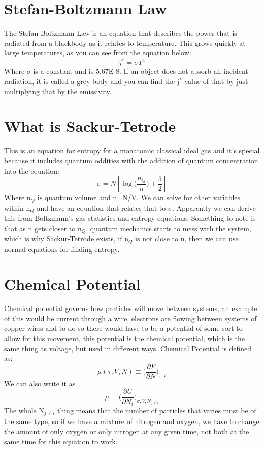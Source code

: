 \documentclass[arial]{article}
\begin{document}
\section*{Stefan-Boltzmann Law}
The Stefan-Boltzmann Law is an equation that describes the power that is radiated from a blackbody as it relates to temperature. This grows quickly at large temperatures, as you can see from the equation below:
\begin{equation}
j^*=\sigma T^4
\end{equation}
Where $\sigma$ is a constant and is 5.67E-8. If an object does not absorb all incident radiation, it is called a grey body and you can find the j$^*$ value of that by just multiplying that by the emissivity.

\section*{What is Sackur-Tetrode}
This is an equation for entropy for a monatomic classical ideal gas and it's special because it includes quantum oddities with the addition of quantum concentration into the equation:
\begin{equation}
\sigma = N[\log \bigg(\frac{n_Q}{n}\bigg)+\frac{5}{2}]
\end{equation}
Where n$_Q$ is quantum volume and n=N/V. We can solve for other variables within n$_Q$ and have an equation that relates that to $\sigma$. Apparently we can derive this from Boltzmann's gas statistics and entropy equations. Something to note is that as n gets closer to n$_Q$, quantum mechanics starts to mess with the system, which is why Sackur-Tetrode exists, if n$_Q$ is not close to n, then we can use normal equations for finding entropy.

\section*{Chemical Potential}
Chemical potential governs how particles will move between systems, an example of this would be current through a wire, electrons are flowing between systems of copper wires and to do so there would have to be a potential of some sort to allow for this movement, this potential is the chemical potential, which is the same thing as voltage, but used in different ways.
Chemical Potential is defined as:
\begin{equation}
\mu(\tau,V,N)\equiv \bigg(\frac{\partial F}{\partial N}\bigg)_{\tau,V}
\end{equation}
We can also write it as
\begin{equation}
\mu = \bigg(\frac{\partial U}{\partial N_i}\bigg)_{\sigma,V,N_{j\neq i}}
\end{equation}
The whole N$_{j\neq i}$ thing means that the number of particles that varies must be of the same type, so if we have a mixture of nitrogen and oxygen, we have to change the amount of only oxygen or only nitrogen at any given time, not both at the same time for this equation to work.
\end{document}
